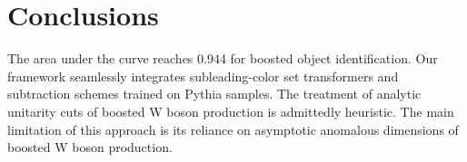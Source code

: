 \section{Conclusions}\label{sec:conclusions}

The area under the curve reaches 0.944 for boosted object
identification. Our framework seamlessly integrates subleading-color set
transformers and subtraction schemes trained on Pythia samples. The
treatment of analytic unitarity cuts of boosted W boson production is
admittedly heuristic. The main limitation of this approach is its
reliance on asymptotic anomalous dimensions of boosted W boson
production.

